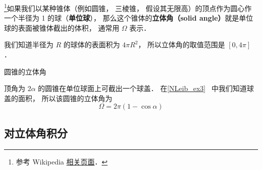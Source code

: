 
\begin{issues}
\issueTODO
\end{issues}

\footnote{参考 Wikipedia \href{https://en.wikipedia.org/wiki/Solid_angle}{相关页面}．}如果我们以某种锥体（例如圆锥， 三棱锥， 假设其无限高）的顶点作为圆心作一个半径为 1 的球（\textbf{单位球}）， 那么这个锥体的\textbf{立体角（solid angle）}就是单位球的表面被锥体截出的体积， 通常用 $\Omega$ 表示．

我们知道半径为 $R$ 的球体的表面积为 $4\pi R^2$， 所以立体角的取值范围是 $[0, 4\pi]$．

\begin{example}{圆锥的立体角}

顶角为 $2\alpha$ 的圆锥在单位球面上可截出一个球盖． 在\autoref{NLeib_ex3}~ 中我们知道球盖的面积， 所以该圆锥的立体角为
\begin{equation}
\Omega = 2\pi (1 - \cos\alpha)
\end{equation}
\end{example}

\subsection{对立体角积分}
